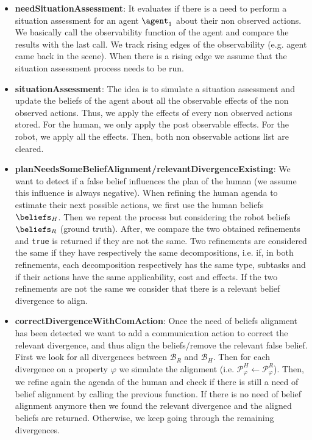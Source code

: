 \begin{itemize}
    \item \textbf{needSituationAssessment}: It evaluates if there is a need to perform a situation assessment for an agent $\agent_1$ about their non observed actions. We basically call the observability function of the agent and compare the results with the last call. We track rising edges of the observability (e.g. agent came back in the scene). When there is a rising edge we assume that the situation assessment process needs to be run.
    
    \item \textbf{situationAssessment}: The idea is to simulate a situation assessment and update the beliefs of the agent about all the observable effects of the non observed actions. Thus, we apply the effects of every non observed actions stored. For the human, we only apply the post observable effects. For the robot, we apply all the effects. Then, both non observable actions list are cleared.
    
    \item \textbf{planNeedsSomeBeliefAlignment/relevantDivergenceExisting}: We want to detect if a false belief influences the plan of the human (we assume this influence is always negative). When refining the human agenda to estimate their next possible actions, we first use the human beliefs $\beliefs_H$. Then we repeat the process but considering the robot beliefs $\beliefs_R$ (ground truth). After, we compare the two obtained refinements and \texttt{true} is returned if they are not the same. Two refinements are considered the same if they have respectively the same decompositions, i.e. if, in both refinements, each decomposition respectively has the same type, subtasks and if their actions have the same applicability, cost and effects. If the two refinements are not the same we consider that there is a relevant belief divergence to align.
    
    \item \textbf{correctDivergenceWithComAction}: Once the need of beliefs alignment has been detected we want to add a communication action to correct the relevant divergence, and thus align the beliefs/remove the relevant false belief. First we look for all divergences between $\mathcal{B}_R$ and $\mathcal{B}_H$. Then for each divergence on a property $\varphi$ we simulate the alignment (i.e. $\mathcal{P}_\varphi^H \gets \mathcal{P}_\varphi^R$). Then, we refine again the agenda of the human and check if there is still a need of belief alignment by calling the previous function. If there is no need of belief alignment anymore then we found the relevant divergence and the aligned beliefs are returned. Otherwise, we keep going through the remaining divergences.
    
\end{itemize}


